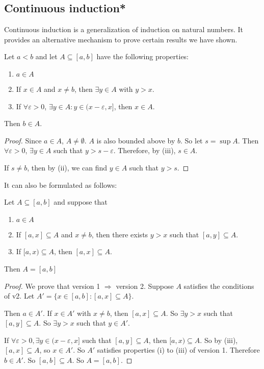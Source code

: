 \documentclass[a4paper]{article}
\begin{document}
\subsection{Continuous induction*}
Continuous induction is a generalization of induction on natural numbers. It provides an alternative mechanism to prove certain results we have shown.

\begin{prop}
  Let $a < b$ and let $A\subseteq [a, b]$ have the following properties:
  \begin{enumerate}
    \item $a\in A$
    \item If $x\in A$ and $x\not= b$, then $\exists y\in A$ with $y > x$.
    \item If $\forall \varepsilon > 0$, $\exists y\in A: y\in (x - \varepsilon, x]$, then $x\in A$.
  \end{enumerate}
  Then $b\in A$.
\end{prop}

\begin{proof}
  Since $a\in A$, $A\not= \emptyset$. $A$ is also bounded above by $b$. So let $s = \sup A$. Then $\forall \varepsilon > 0$, $\exists y\in A$ such that $y > s - \varepsilon$. Therefore, by (iii), $s\in A$.

  If $s\not= b$, then by (ii), we can find $y\in A$ such that $y > s$.
\end{proof}

It can also be formulated as follows:
\begin{prop}
  Let $A\subseteq [a, b]$ and suppose that
  \begin{enumerate}
    \item $a\in A$
    \item If $[a, x]\subseteq A$ and $x\not = b$, then there exists $y > x$ such that $[a, y]\subseteq A$.
    \item If $[a, x)\subseteq A$, then $[a, x]\subseteq A$.
  \end{enumerate}
  Then $A = [a, b]$
\end{prop}

\begin{proof}
  We prove that version 1 $\Rightarrow$ version 2.
  Suppose $A$ satisfies the conditions of v2. Let $A' = \{x\in [a, b]: [a, x]\subseteq A\}$.

  Then $a\in A'$. If $x\in A'$ with $x \not= b$, then $[a, x]\subseteq A$. So $\exists y > x$ such that $[a, y] \subseteq A$. So $\exists y > x$ such that $y\in A'$.

  If $\forall \varepsilon > 0, \exists y\in (x - \varepsilon, x]$ such that $[a, y]\subseteq A$, then $[a, x)\subseteq A$. So by (iii), $[a, x]\subseteq A$, so $x\in A'$. So $A'$ satisfies properties (i) to (iii) of version 1. Therefore $b\in A'$. So $[a, b]\subseteq A$. So $A = [a, b]$.
\end{proof}
\end{document}
